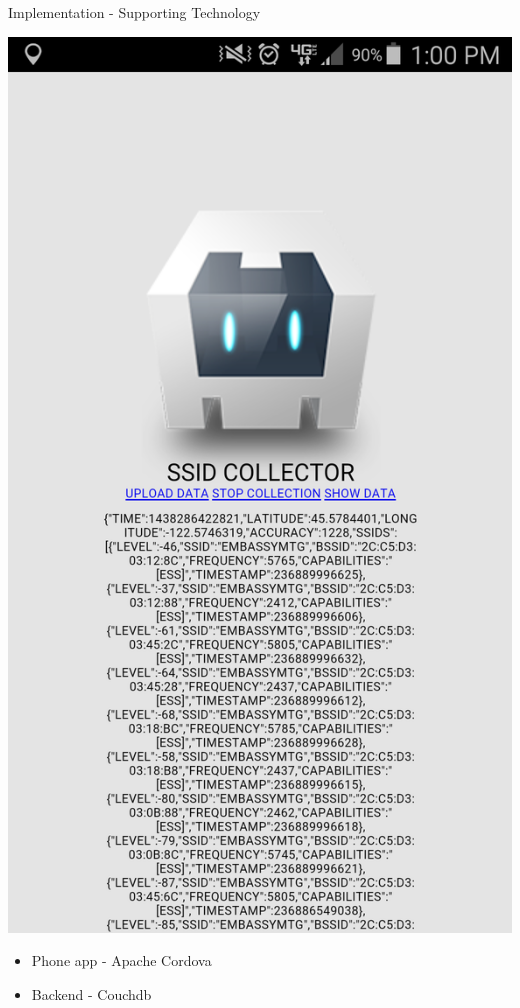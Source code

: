 \documentclass[11pt]{beamer}
\begin{document}
\begin{frame}{Implementation - Supporting Technology}

\begin{multicols}{2}
\includegraphics[height=0.7\textheight]{pictures/phoneapp.png}
\vfill\columnbreak

\begin{itemize}
\item Phone app - Apache Cordova
\item Backend - Couchdb
\end{itemize}
\end{multicols}

\end{frame}
\end{document}
